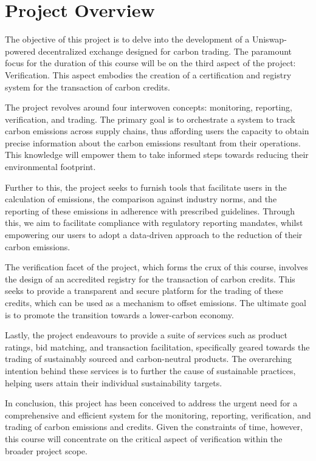 \documentclass[sigconf, authordraft]{acmart}
\begin{document}
	\section{Project Overview}


	The objective of this project is to delve into the development of a Uniswap-powered
	decentralized exchange designed for carbon trading. The paramount focus for
	the duration of this course will be on the third aspect of the project: Verification.
	This aspect embodies the creation of a certification and registry system for
	the transaction of carbon credits.

	The project revolves around four interwoven concepts: monitoring, reporting, verification,
	and trading. The primary goal is to orchestrate a system to track carbon emissions
	across supply chains, thus affording users the capacity to obtain precise
	information about the carbon emissions resultant from their operations. This knowledge
	will empower them to take informed steps towards reducing their environmental footprint.

	Further to this, the project seeks to furnish tools that facilitate users in
	the calculation of emissions, the comparison against industry norms, and the
	reporting of these emissions in adherence with prescribed guidelines. Through this,
	we aim to facilitate compliance with regulatory reporting mandates, whilst empowering
	our users to adopt a data-driven approach to the reduction of their carbon emissions.

	The verification facet of the project, which forms the crux of this course, involves
	the design of an accredited registry for the transaction of carbon credits.
	This seeks to provide a transparent and secure platform for the trading of
	these credits, which can be used as a mechanism to offset emissions. The
	ultimate goal is to promote the transition towards a lower-carbon economy.

	Lastly, the project endeavours to provide a suite of services such as product ratings,
	bid matching, and transaction facilitation, specifically geared towards the
	trading of sustainably sourced and carbon-neutral products. The overarching intention
	behind these services is to further the cause of sustainable practices,
	helping users attain their individual sustainability targets.

	In conclusion, this project has been conceived to address the urgent need for a
	comprehensive and efficient system for the monitoring, reporting, verification,
	and trading of carbon emissions and credits. Given the constraints of time,
	however, this course will concentrate on the critical aspect of verification within
	the broader project scope.
\end{document}
